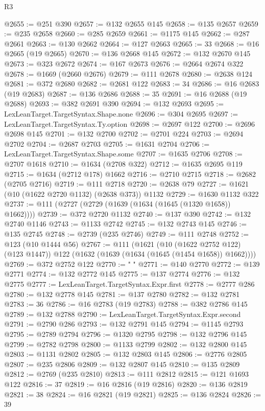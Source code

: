 \begin{lexlean}{R3}
\begin{coremodule}
@2655 := @251 @390
@2657 := @132 @2655 @145
@2658 := @135 @2657
@2659 := @235 @2658
@2660 := @285 @2659
@2661 := @1175 @145
@2662 := @287 @2661
@2663 := @130 @2662
@2664 := @127 @2663
@2665 := 33
@2668 := @16 @2665 (@19 @2665)
@2670 := @136 @2668 @145
@2672 := @132 @2670 @145
@2673 := @323 @2672
@2674 := @167 @2673
@2676 := @2664 @2674 @322
@2678 := @1669 (@2660 @2676)
@2679 := @111 @2678
@2680 := @2638 @124
@2681 := @372 @2680
@2682 := @2681 @122
@2683 := 34
@2686 := @16 @2683 (@19 @2683)
@2687 := @136 @2686
@2688 := 35
@2691 := @16 @2688 (@19 @2688)
@2693 := @382 @2691 @390
@2694 := @132 @2693
@2695 := LexLeanTarget.TargetSyntax.Shape.none
@2696 := @304 @2695
@2697 := LexLeanTarget.TargetSyntax.Ty.option
@2698 := @2697 @122
@2700 := @2696 @2698 @145
@2701 := @132 @2700
@2702 := @2701 @224
@2703 := @2694 @2702
@2704 := @2687 @2703
@2705 := @1631 @2704
@2706 := LexLeanTarget.TargetSyntax.Shape.some
@2707 := @1635 @2706
@2708 := @2707 @1618
@2710 := @1634 (@2708 @322)
@2712 := @1635 @2695 @119
@2715 := @1634 (@2712 @178) @1662
@2716 := @2710 @2715
@2718 := @2682 (@2705 @2716)
@2719 := @111 @2718
@2720 := @2638 @79
@2727 := @1621 (@10 (@1622 @2720 @1132) (@2638 @373)) @1132
@2729 := @1630 @1132 @322
@2737 := @111 (@2727 (@2729 (@1639 (@1634 (@1645 (@1320 @1658)) @1662))))
@2739 := @372 @2720 @1132
@2740 := @137 @390
@2742 := @132 @2740 @1146
@2743 := @1133 @2742
@2745 := @132 @2743 @145
@2746 := @135 @2745
@2748 := @2739 (@235 @2746)
@2749 := @111 @2748
@2752 := @123 (@10 @1444 @56)
@2767 := @111
    (@1621
      (@10 (@1622 @2752 @122) (@123 @1447))
      @122
      (@1632 (@1639 (@1634 (@1645 (@1454 @1658)) @1662))))
@2769 := @372 @2752 @122
@2770 := "            "
@2771 := @140 @2770
@2772 := @139 @2771
@2774 := @132 @2772 @145
@2775 := @137 @2774
@2776 := @132 @2775
@2777 := LexLeanTarget.TargetSyntax.Expr.first
@2778 := @2777 @286
@2780 := @132 @2778 @145
@2781 := @137 @2780
@2782 := @132 @2781
@2783 := 36
@2786 := @16 @2783 (@19 @2783)
@2788 := @382 @2786 @145
@2789 := @132 @2788
@2790 := LexLeanTarget.TargetSyntax.Expr.second
@2791 := @2790 @286
@2793 := @132 @2791 @145
@2794 := @1145 @2793
@2795 := @2789 @2794
@2796 := @1320 @2795
@2798 := @132 @2796 @145
@2799 := @2782 @2798
@2800 := @1133 @2799
@2802 := @132 @2800 @145
@2803 := @1131 @2802
@2805 := @132 @2803 @145
@2806 := @2776 @2805
@2807 := @235 @2806
@2809 := @132 @2807 @145
@2810 := @135 @2809
@2812 := @2769 (@235 @2810)
@2813 := @111 @2812
@2815 := @121 @1693 @122
@2816 := 37
@2819 := @16 @2816 (@19 @2816)
@2820 := @136 @2819
@2821 := 38
@2824 := @16 @2821 (@19 @2821)
@2825 := @136 @2824
@2826 := 39

\end{coremodule}
\end{lexlean}
